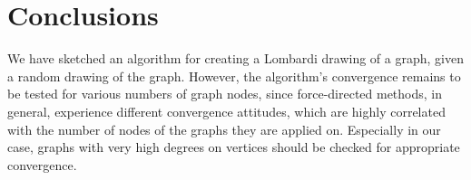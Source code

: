 \documentclass[10pt]{article}
\begin{document}
\section{Conclusions}

We have sketched an algorithm for creating a Lombardi drawing of a graph, given a random drawing of the graph. However, the algorithm's convergence remains to be tested for various numbers of graph nodes, since force-directed methods, in general, experience different convergence attitudes, which are highly correlated with the number of nodes of the graphs they are applied on. Especially in our case, graphs with very high degrees on vertices should be checked for appropriate convergence.



		
\end{document}
